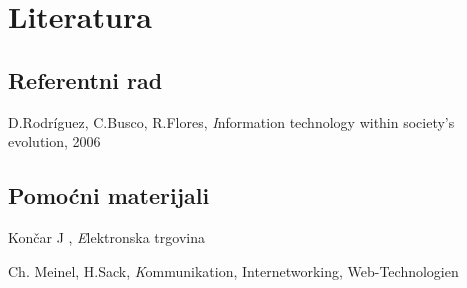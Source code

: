 \documentclass[10pt]{article}
\begin{document}
    \linespread{4}
    
	\section*{Literatura}
	\subsection*{Referentni rad}
	
		 \item D.Rodríguez, C.Busco, R.Flores,  \emph Information technology within society's evolution, 2006
		 
	\subsection*{Pomoćni materijali}
	
		 \item Končar J , \emph Elektronska trgovina 
		 \item Ch. Meinel, H.Sack,  \emph Kommunikation, Internetworking, Web-Technologien
		 

	
\end{document}
